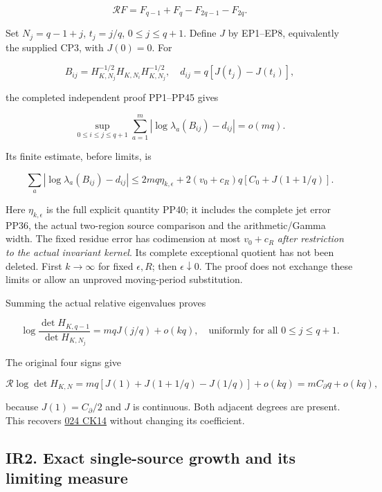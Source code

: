 \documentclass[10pt]{article}
\begin{document}
\[
 \mathcal RF=F_{q-1}+F_q-F_{2q-1}-F_{2q}.
 \tag{IR4}
\]

Set \(N_j=q-1+j\), \(t_j=j/q\), \(0\le j\le q+1\). Define \(J\) by EP1--EP8, equivalently the supplied CP3, with \(J(0)=0\). For

\[
 B_{ij}=H_{K,N_j}^{-1/2}H_{K,N_i}H_{K,N_j}^{-1/2},\quad
 d_{ij}=q[J(t_j)-J(t_i)],
 \tag{IR5}
\]

the completed independent proof PP1--PP45 gives

\[
 \sup_{0\le i\le j\le q+1}\sum_{a=1}^m
 |\log\lambda_a(B_{ij})-d_{ij}|=o(mq).
 \tag{IR6}
\]

Its finite estimate, before limits, is

\[
 \sum_a|\log\lambda_a(B_{ij})-d_{ij}|
 \le2mq\eta_{k,\epsilon}
 +2(v_0+c_R)q[C_0+J(1+1/q)].
 \tag{IR7}
\]

Here \(\eta_{k,\epsilon}\) is the full explicit quantity PP40; it includes the complete jet error PP36, the actual two-region source comparison and the arithmetic/Gamma width. The fixed residue error has codimension at most \(v_0+c_R\) \emph{after restriction to the actual invariant kernel}. Its complete exceptional quotient has not been deleted. First \(k\to\infty\) for fixed \(\epsilon,R\); then \(\epsilon\downarrow0\). The proof does not exchange these limits or allow an unproved moving-period substitution.

Summing the actual relative eigenvalues proves

\[
 \boxed{\log\frac{\det H_{K,q-1}}{\det H_{K,N_j}}
 =mqJ(j/q)+o(kq),\quad\text{uniformly for all }0\le j\le q+1.}
 \tag{IR8}
\]

The original four signs give

\[
 \mathcal R\log\det H_{K,N}
 =mq[J(1)+J(1+1/q)-J(1/q)]+o(kq)
 =mC_\partial q+o(kq),
 \tag{IR9}
\]

because \(J(1)=C_\partial/2\) and \(J\) is continuous. Both adjacent degrees are present. This recovers \href{https://github.com/KokunoYumeto/zeta-function-research-reader/blob/1447462732b40b1474bd9a819cf79257f5326ada/workbenches/splitzero-tandem/continuations/20260922-kernel-frequency/COMBINED_KERNEL_AND_RECEIVERS.md\#L148}{024 CK14} without changing its coefficient.

\subsection{IR2. Exact single-source growth and its limiting measure}\label{ir2.-exact-single-source-growth-and-its-limiting-measure}
\end{document}
